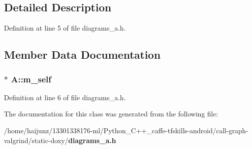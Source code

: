 \subsection{Detailed Description}


Definition at line 5 of file diagrams\-\_\-a.\-h.



\subsection{Member Data Documentation}
\subsubsection[{m\-\_\-self}]{$\ast$ A\-::m\-\_\-self}\label{class_a_a086d3a4efc697dba0601b9fef3d082ad}


Definition at line 6 of file diagrams\-\_\-a.\-h.



The documentation for this class was generated from the following file\-:\begin{DoxyCompactItemize}
\item 
/home/haijunz/13301338176-\/ml/\-Python\-\_\-\-C++\-\_\-caffe-\/tfskills-\/android/call-\/graph-\/valgrind/static-\/doxy/{\bf diagrams\-\_\-a.\-h}\end{DoxyCompactItemize}
